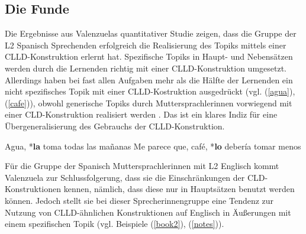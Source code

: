 
\subsection{Die Funde}

Die Ergebnisse aus Valenzuelas quantitativer Studie zeigen, dass die Gruppe der L2 Spanisch Sprechenden erfolgreich die Realisierung des Topiks mittels einer CLLD-Konstruktion erlernt hat.
Spezifische Topiks in Haupt- und Nebensätzen werden durch die Lernenden richtig mit einer CLLD-Konstruktion umgesetzt.
Allerdings haben bei fast allen Aufgaben mehr als die Hälfte der Lernenden ein nicht spezifisches Topik mit einer CLLD-Kostruktion ausgedrückt (vgl. (\ref{agua}), (\ref{cafe})),
obwohl generische Topiks durch Muttersprachlerinnen vorwiegend mit einer CLD-Konstruktion realisiert werden \cite[vgl.][S.5-7]{Valenzuela05}.
Das ist ein klares Indiz für eine Übergeneralisierung des Gebrauchs der CLLD-Konstruktion.

\begin{exe}
    \ex \label{agua} Agua, *\textbf{la} toma todas las mañanas
    \ex \label{cafe}Me parece que, café, *\textbf{lo} debería tomar menos
\end{exe}

Für die Gruppe der Spanisch Muttersprachlerinnen mit L2 Englisch kommt Valenzuela zur Schlussfolgerung,
dass sie die Einschränkungen der CLD-Konstruktionen kennen, nämlich, dass diese nur in Hauptsätzen benutzt werden können.
Jedoch stellt sie bei dieser Sprecherinnengruppe eine Tendenz zur Nutzung von CLLD-ähnlichen Konstruktionen auf Englisch in Äußerungen mit einem spezifischen Topik (vgl. Beispiele (\ref{book2}), (\ref{notes})).

